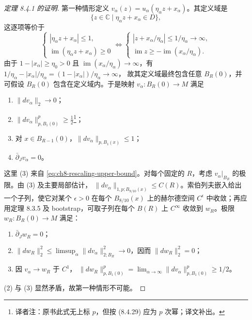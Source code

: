 \begin{proof}[定理 8.4.1 的证明]
第一种情形定义 $v_\alpha(z)=u_\alpha(\eta_\alpha z+x_\alpha)$。其定义域是
\[
 \{z\in\mathbb C\mid\eta_\alpha z+x_\alpha\in D\},
\]
这逐项等价于
\[
 \begin{cases}|\eta_\alpha z+x_\alpha|\leq1,\\
 \operatorname{im}(\eta_\alpha z+x_\alpha)\geq0
 \end{cases}
 \Longleftrightarrow
 \begin{cases}|z+x_\alpha/\eta_\alpha|\leq1/\eta_\alpha\to\infty,\\
 \operatorname{im}z\geq-\operatorname{im}(x_\alpha/\eta_\alpha).
 \end{cases}
\]
由于 $1-|x_\alpha|\geq\eta_0>0$ 且
$\operatorname{im}(x_\alpha/\eta_\alpha)\to\infty$，有
$1/\eta_\alpha-|x_\alpha|/\eta_\alpha=(1-|x_\alpha|)/\eta_\alpha\to\infty$，
故其定义域最终包含任意
$B_R(0)$，并可假设 $B_R(0)$ 包含在定义域内。于是映射
$v_\alpha:B_R(0)\to M$ 满足
\begin{enumerate}[label=(\arabic*)]
\item $\|dv_\alpha\|_2\to0$；
\item $\|dv_\alpha\|_{p,B_1(0)}^p\geq\frac12$\footnote{译者注：原书此式无上标 $p$，但按 (8.4.29) 应为 $p$ 次幂；译文补出。}；
\item 对 $x\in B_{R-1}(0)$，$\|dv_\alpha\|_{p,B_1(x)}\leq1$；
\item $\bar\partial_Jv_\alpha=0$。
\end{enumerate}
这里 (3) 来自 \eqref{eq:ch8-rescaling-upper-bound}。对每个固定的 $R$，考虑
$v_\alpha|_{B_R}$ 的极限。由 (3) 及主要局部估计，
$\|dv_\alpha\|_{1,p;B_{9/10}(x)}\leq C(R)$。索伯列夫嵌入给出一个子列，使它对某个 $\epsilon>0$ 在每个
$B_{8/10}(x)$ 上的赫尔德空间 $C^\epsilon$ 中收敛；再应用定理 8.3.5 及 bootstrap，可取子列在每个 $B(R)$ 上
$C^\infty$ 收敛到 $w_R$。极限 $w_R:B_R(0)\to M$ 满足：
\begin{enumerate}[label=(\arabic*)]
\item $\bar\partial_Jw_R=0$；
\item $\|dw_R\|_2^2\leq\limsup_\alpha\|dv_\alpha\|_{2;B_R}^2\to0$，因而
$\|dw_R\|_2^2=0$；
\item 因 $v_\alpha\to w_R$ 于 $C^1$，
$\|dw_R\|_{p,B_1(0)}^p=\lim_{\alpha\to\infty}
\|dv_\alpha\|_{p,B_1(0)}^p\geq1/2$。
\end{enumerate}
(2) 与 (3) 显然矛盾，故第一种情形不可能。


\end{proof}
